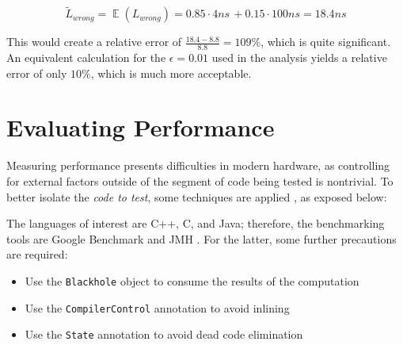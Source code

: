 \begin{equation}
    \tilde{L}_{wrong} = \mathop{\mathbb{E}}(L_{wrong}) = 0.85 \cdot 4 ns \, + 0.15 \cdot 100 ns = 18.4ns
\end{equation}

This would create a relative error of $\frac{18.4 - 8.8}{8.8} =  109\%$, which is quite significant. An equivalent calculation for the $\epsilon = 0.01$ used in the analysis yields a relative
error of only $10\%$, which is much more acceptable. 

\section{Evaluating Performance}\label{subsec:microbench}
Measuring performance presents difficulties in modern hardware, as controlling for external factors outside of the segment of code being tested is nontrivial.  
To better isolate the \textit{code to test}, some techniques are applied \cite{AvoidingBenchmarkingPitfalls,beyerBenchmarkingResourceMeasurement2015,BenchmarkingTipsLLVM}, as exposed below:

\vspace{0.3cm}
\vspace{0.3cm}

The languages of interest are C++, C, and Java; therefore, the benchmarking tools are Google Benchmark \cite{GoogleBenchmarkMicrobenchmark} and JMH \cite{AvoidingBenchmarkingPitfalls}.
For the latter, some further precautions are required:

\begin{itemize}
    \item Use the \verb|Blackhole| object to consume the results of the computation
    \item Use the \verb|CompilerControl| annotation to avoid inlining
    \item Use the \verb|State| annotation to avoid dead code elimination
\end{itemize}

